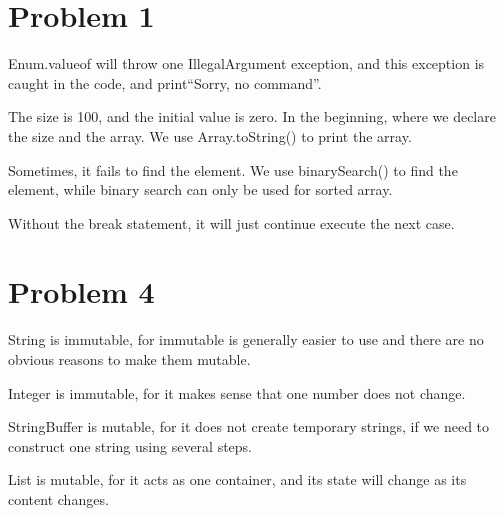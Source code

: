 \documentclass[a4paper, 11pt]{report}
\begin{document}
\section{Problem 1}
Enum.valueof will throw one IllegalArgument exception, and this exception is caught in the code, and print``Sorry, no command''.

The size is 100, and the initial value is zero. In the beginning, where we declare the size and the array. We use Array.toString() to print the array.

Sometimes, it fails to find the element. We use binarySearch() to find the element, while binary search can only be used for sorted array.

Without the break statement, it will just continue execute the next case.

\section{Problem 4}
String is immutable, for immutable is generally easier to use and there are no obvious reasons to make them mutable.

Integer is immutable, for it makes sense that one number does not change.

StringBuffer is mutable, for it does not create temporary strings, if we need to construct one string using several steps.

List is mutable, for it acts as one container, and its state will change as its content changes.
\end{document}
